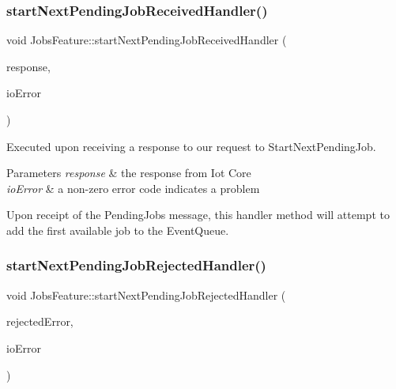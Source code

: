 \subsubsection{\texorpdfstring{start\+Next\+Pending\+Job\+Received\+Handler()}{startNextPendingJobReceivedHandler()}}
{\footnotesize\ttfamily void Jobs\+Feature\+::start\+Next\+Pending\+Job\+Received\+Handler (\begin{DoxyParamCaption}\item[{Iotjobs\+::\+Start\+Next\+Job\+Execution\+Response $\ast$}]{response,  }\item[{int}]{io\+Error }\end{DoxyParamCaption})\hspace{0.3cm}{\ttfamily [private]}}



Executed upon receiving a response to our request to Start\+Next\+Pending\+Job. 


\begin{DoxyParams}{Parameters}
{\em response} & the response from Iot Core \\
\hline
{\em io\+Error} & a non-\/zero error code indicates a problem\\
\hline
\end{DoxyParams}
Upon receipt of the Pending\+Jobs message, this handler method will attempt to add the first available job to the Event\+Queue. \mbox{\label{class_aws_1_1_iot_1_1_device_client_1_1_jobs_1_1_jobs_feature_a974eb6561346d4612c975a9df28ad516}} 
\subsubsection{\texorpdfstring{start\+Next\+Pending\+Job\+Rejected\+Handler()}{startNextPendingJobRejectedHandler()}}
{\footnotesize\ttfamily void Jobs\+Feature\+::start\+Next\+Pending\+Job\+Rejected\+Handler (\begin{DoxyParamCaption}\item[{Iotjobs\+::\+Rejected\+Error $\ast$}]{rejected\+Error,  }\item[{int}]{io\+Error }\end{DoxyParamCaption})\hspace{0.3cm}{\ttfamily [private]}}



